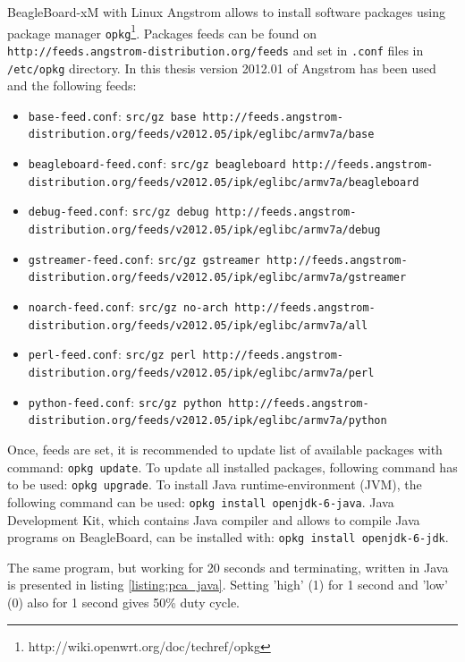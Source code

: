 BeagleBoard-xM with Linux Angstrom allows to install software packages using package manager \lstinline{opkg}\footnote{http://wiki.openwrt.org/doc/techref/opkg}. Packages feeds can be found on \lstinline{http://feeds.angstrom-distribution.org/feeds} and set in \lstinline{.conf} files in \lstinline{/etc/opkg} directory. In this thesis version 2012.01 of Angstrom has been used and the following feeds:
\begin{itemize}
	\item \lstinline{base-feed.conf}: \lstinline{src/gz base http://feeds.angstrom-distribution.org/feeds/v2012.05/ipk/eglibc/armv7a/base}
	\item \lstinline{beagleboard-feed.conf}: \lstinline{src/gz beagleboard http://feeds.angstrom-distribution.org/feeds/v2012.05/ipk/eglibc/armv7a/beagleboard}
	\item \lstinline{debug-feed.conf}: \lstinline{src/gz debug http://feeds.angstrom-distribution.org/feeds/v2012.05/ipk/eglibc/armv7a/debug}
	\item \lstinline{gstreamer-feed.conf}: \lstinline{src/gz gstreamer http://feeds.angstrom-distribution.org/feeds/v2012.05/ipk/eglibc/armv7a/gstreamer}
	\item \lstinline{noarch-feed.conf}: \lstinline{src/gz no-arch http://feeds.angstrom-distribution.org/feeds/v2012.05/ipk/eglibc/armv7a/all}
	\item \lstinline{perl-feed.conf}: \lstinline{src/gz perl http://feeds.angstrom-distribution.org/feeds/v2012.05/ipk/eglibc/armv7a/perl}
	\item \lstinline{python-feed.conf}: \lstinline{src/gz python http://feeds.angstrom-distribution.org/feeds/v2012.05/ipk/eglibc/armv7a/python}
\end{itemize}

Once, feeds are set, it is recommended to update list of available packages with command: \lstinline{opkg update}. To update all installed packages, following command has to be used: \lstinline{opkg upgrade}. To install Java runtime-environment (JVM), the following command can be used: \lstinline{opkg install openjdk-6-java}. Java Development Kit, which contains Java compiler and allows to compile Java programs on BeagleBoard, can be installed with: \lstinline{opkg install openjdk-6-jdk}.

The same program, but working for 20 seconds and terminating, written in Java is presented in listing \ref{listing:pca_java}. Setting 'high' (1) for 1 second and 'low' (0) also for 1 second gives 50\% duty cycle.

